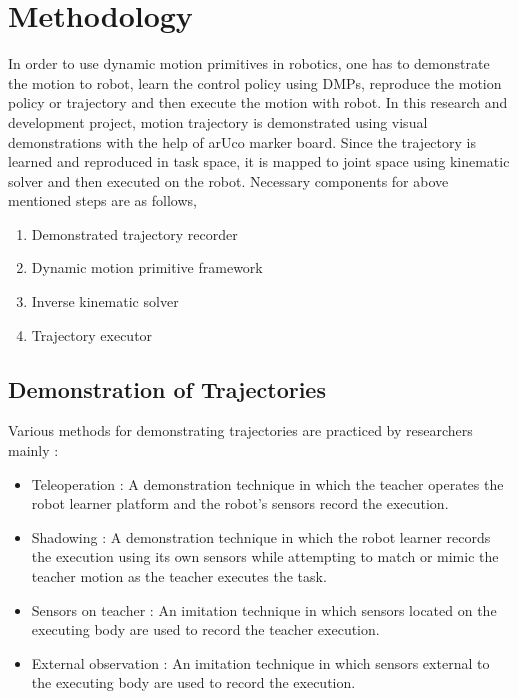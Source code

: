 \chapter{Methodology}
In order to use dynamic motion primitives in robotics, one has to demonstrate the motion to robot, learn the control policy using DMPs, reproduce the motion policy or trajectory and then execute the motion with robot. In this research and development project, motion trajectory is demonstrated using visual demonstrations with the help of arUco marker board. Since the trajectory is learned and reproduced in task space, it is mapped to joint space using kinematic solver and then executed on the robot. Necessary components for above mentioned steps are as follows, 
\begin{enumerate}
	\item Demonstrated trajectory recorder 
	\item Dynamic motion primitive framework
	\item Inverse kinematic solver
	\item Trajectory executor
\end{enumerate} 
\section{Demonstration of Trajectories}
Various methods for demonstrating trajectories are practiced by researchers mainly :
\begin{itemize} 
	
	\item Teleoperation : A demonstration technique in which the teacher operates the robot learner platform and the robot’s sensors record the execution. 	\cite{argall2009survey}	
	
	\item Shadowing : A demonstration technique in which the robot learner records the execution using its own sensors while attempting to match or mimic the teacher motion as the teacher executes the task.
	
	\item Sensors on teacher : An imitation technique in which sensors located on the executing body are used to record the teacher execution.
	
	\item External observation : An imitation technique in which sensors external to the executing body are used to record the execution.
	
\end{itemize}

